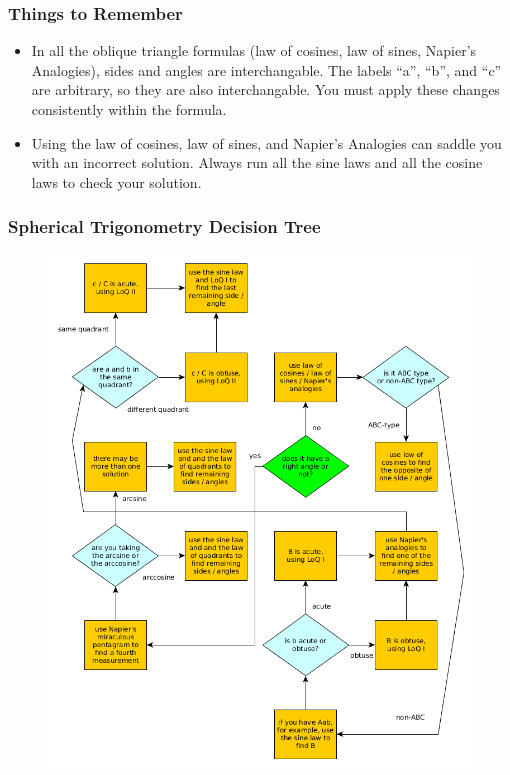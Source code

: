 \documentclass[xcolor=dvipsnames]{beamer}
\begin{document}
\begin{frame}
  \frametitle{Things to Remember}
  \begin{itemize}
  \item In all the oblique triangle formulas (law of cosines, law of
    sines, Napier's Analogies), sides and angles are interchangable.
    The labels ``a'', ``b'', and ``c'' are arbitrary, so they are also
    interchangable. You must apply these changes consistently within
    the formula.
  \item Using the law of cosines, law of sines, and Napier's Analogies
    can saddle you with an incorrect solution. Always run all the sine
    laws and all the cosine laws to check your solution.
  \end{itemize}
\end{frame}

\begin{frame}
  \frametitle{Spherical Trigonometry Decision Tree}
    \begin{figure}[h]
    \includegraphics[scale=.25]{./sphericalTrig.png}
  \end{figure}
\end{frame}
\end{document}

